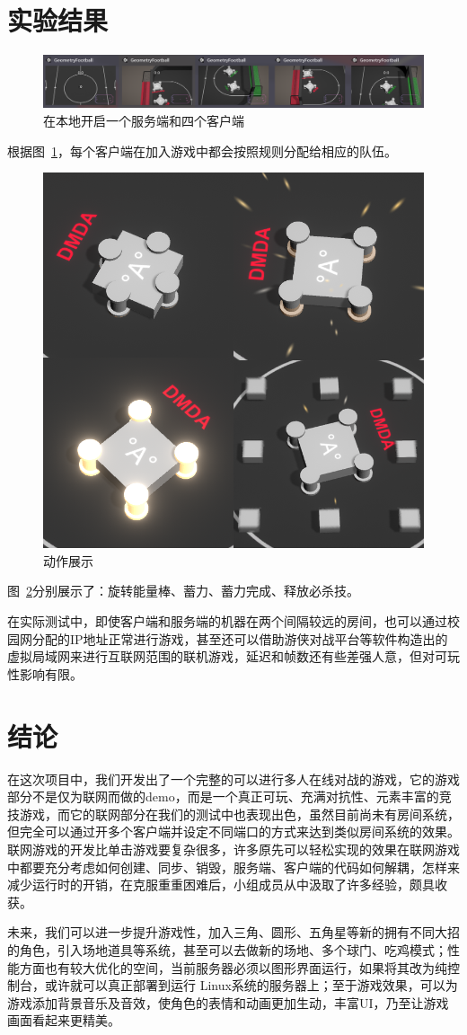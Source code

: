 \documentclass[conference]{IEEEtran}
\begin{document}
\section{实验结果}

\begin{figure}[htbp]
  \centerline{\includegraphics[width=.46\textwidth]{images/result1.png}}
  \caption{在本地开启一个服务端和四个客户端}
  \label{fig:result1}
\end{figure}
  根据图~\ref{fig:result1}，每个客户端在加入游戏中都会按照规则分配给相应的队伍。

\begin{figure}[htbp]
  \centerline{\includegraphics[width=.32\textwidth]{images/result2.png}}
  \caption{动作展示}
  \label{fig:result2}
\end{figure}
  图~\ref{fig:result2}分别展示了：旋转能量棒、蓄力、蓄力完成、释放必杀技。

  在实际测试中，即使客户端和服务端的机器在两个间隔较远的房间，也可以通过校园网分配的IP地址正常进行游戏，甚至还可以借助游侠对战平台等软件构造出的虚拟局域网来进行互联网范围的联机游戏，延迟和帧数还有些差强人意，但对可玩性影响有限。

\section{结论}
在这次项目中，我们开发出了一个完整的可以进行多人在线对战的游戏，它的游戏部分不是仅为联网而做的demo，而是一个真正可玩、充满对抗性、元素丰富的竞技游戏，而它的联网部分在我们的测试中也表现出色，虽然目前尚未有房间系统，但完全可以通过开多个客户端并设定不同端口的方式来达到类似房间系统的效果。联网游戏的开发比单击游戏要复杂很多，许多原先可以轻松实现的效果在联网游戏中都要充分考虑如何创建、同步、销毁，服务端、客户端的代码如何解耦，怎样来减少运行时的开销，在克服重重困难后，小组成员从中汲取了许多经验，颇具收获。

未来，我们可以进一步提升游戏性，加入三角、圆形、五角星等新的拥有不同大招的角色，引入场地道具等系统，甚至可以去做新的场地、多个球门、吃鸡模式；性能方面也有较大优化的空间，当前服务器必须以图形界面运行，如果将其改为纯控制台，或许就可以真正部署到运行 Linux系统的服务器上；至于游戏效果，可以为游戏添加背景音乐及音效，使角色的表情和动画更加生动，丰富UI，乃至让游戏画面看起来更精美。




\end{document}
